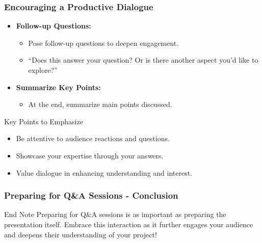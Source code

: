 \documentclass[aspectratio=169]{beamer}
\begin{document}
\begin{frame}[fragile]
    \frametitle{Encouraging a Productive Dialogue}
    \begin{itemize}
        \item \textbf{Follow-up Questions:} 
        \begin{itemize}
            \item Pose follow-up questions to deepen engagement.
            \item “Does this answer your question? Or is there another aspect you’d like to explore?”
        \end{itemize}

        \item \textbf{Summarize Key Points:} 
        \begin{itemize}
            \item At the end, summarize main points discussed.
        \end{itemize}
    \end{itemize}
    \begin{block}{Key Points to Emphasize}
        \begin{itemize}
            \item Be attentive to audience reactions and questions.
            \item Showcase your expertise through your answers. 
            \item Value dialogue in enhancing understanding and interest.
        \end{itemize}
    \end{block}
\end{frame}

\begin{frame}[fragile]
    \frametitle{Preparing for Q\&A Sessions - Conclusion}
    \begin{block}{End Note}
        Preparing for Q\&A sessions is as important as preparing the presentation itself. Embrace this interaction as it further engages your audience and deepens their understanding of your project!
    \end{block}
\end{frame}
\end{document}
